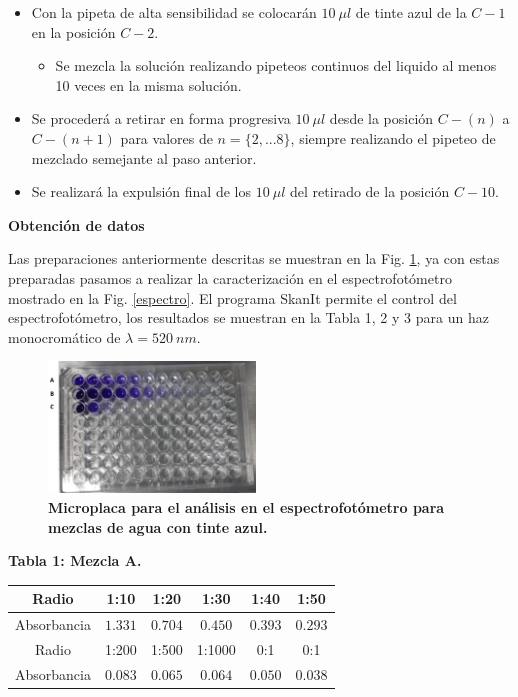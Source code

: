 \begin{itemize}
\begin{itemize}
        \item Con la pipeta de alta sensibilidad se colocarán $10~\mu l$ de tinte azul de la $C-1$ en la posición $C-2$.
        \begin{itemize}
            \item Se mezcla la solución realizando pipeteos continuos del liquido al menos 10 veces en la misma solución.
        \end{itemize}
        \item Se procederá a retirar en forma progresiva $10~\mu l$ desde la posición $C-(n)$ a $C-(n+1)$ para valores de $n=\{2, ...8\}$, siempre realizando el pipeteo de mezclado semejante al paso anterior. 
        \item Se realizará la expulsión final de los $10~\mu l$ del retirado de la posición $C-10$.
        \end{itemize}
\end{itemize}

\textbf{\textcolor{azul50}{Obtención de datos}}

Las preparaciones anteriormente descritas se muestran en la Fig. \ref{microplaca2}, ya con estas preparadas pasamos a realizar la caracterización en el espectrofotómetro mostrado en la Fig. \ref{espectro}. El programa SkanIt permite el control del espectrofotómetro, los resultados se muestran en la Tabla 1, 2 y 3 para un haz monocromático de $\lambda=520~nm$.  

\begin{figure}
    \includegraphics[width=0.49\textwidth]{Tarea2/microplaca2.jpeg}
    \caption{\textbf{Microplaca para el análisis en el espectrofotómetro para mezclas de agua con tinte azul.}}
    \label{microplaca2}
\end{figure}

\textbf{Tabla 1: Mezcla A.}        

\begin{tabular}{|c|c|c|c|c|c|}
    \hline
    Radio & 1:10 & 1:20 & 1:30 & 1:40 & 1:50\\
    \hline
    Absorbancia & $1.331$ & $0.704$ & $0.450$ & $0.393$ & $0.293$ \\
    \hline\hline\hline
    Radio & 1:200 & 1:500 & 1:1000 & 0:1 & 0:1\\
    \hline
    Absorbancia & $0.083$ & $0.065$ & $0.064$ & $0.050$ & $0.038$\\
    \hline
\end{tabular}
    
